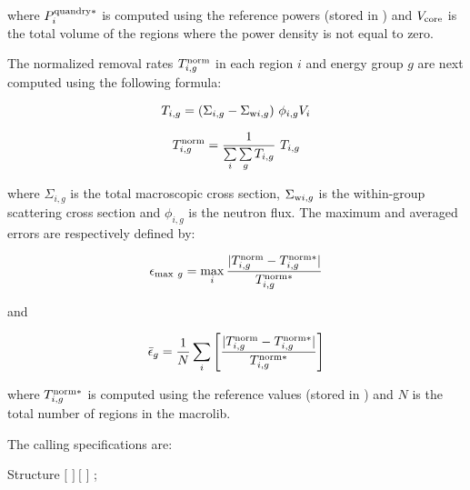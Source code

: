 \noindent where $P_i^{{\rm quandry}*}$ is computed using the reference powers (stored in ) and $V_{\rm core}$ is the total volume of the regions where the power density is not equal to zero.

\vskip 0.2cm

The normalized removal rates $T_{i,g}^{\rm norm}$ in each region $i$ and energy group $g$ are next computed using the following formula:

$$T_{i,g}=(\Sigma_{i,g} -\Sigma_{{\rm w}i,g}) \ \phi_{i,g} V_i$$

$$T_{i,g}^{\rm norm}={1 \over \sum\limits_i \sum\limits_g T_{i,g}} \ T_{i,g}$$

\noindent where $\Sigma_{i,g}$ is the total macroscopic cross section, $\Sigma_{{\rm w}i,g}$ is the within-group scattering cross section and $\phi_{i,g}$ is the neutron flux. The maximum and averaged errors are respectively defined by:

$$\epsilon_{{\rm max} \ g}=\max_i {|T_{i,g}^{\rm norm}-T_{i,g}^{{\rm norm}*}| \over T_{i,g}^{{\rm norm}*}}$$

\noindent and

$$\bar\epsilon_g = {1 \over N} \sum_i \left[ {|T_{i,g}^{\rm norm}-T_{i,g}^{{\rm norm}*}| \over T_{i,g}^{{\rm norm}*}}\right]$$

\noindent where $T_{i,g}^{{\rm norm}*}$ is computed using the reference values (stored in ) and $N$ is the total number of regions in the {\sc macrolib}.

\vskip 0.2cm
\goodbreak

The calling specifications are:

\begin{DataStructure}{Structure }
   \moc{::} $[$   $]~[$   $]$ ;
\end{DataStructure}

